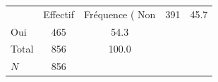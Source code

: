 {
\def\sym#1{\ifmmode^{#1}\else\(^{#1}\)\fi}
\begin{tabular}{l*{1}{cc}}
\toprule
            &    Effectif&Fréquence (%
\midrule
Non         &         391&        45.7\\
Oui         &         465&        54.3\\
Total       &         856&       100.0\\
\midrule
\(N\)       &         856&            \\
\bottomrule
\end{tabular}
}
